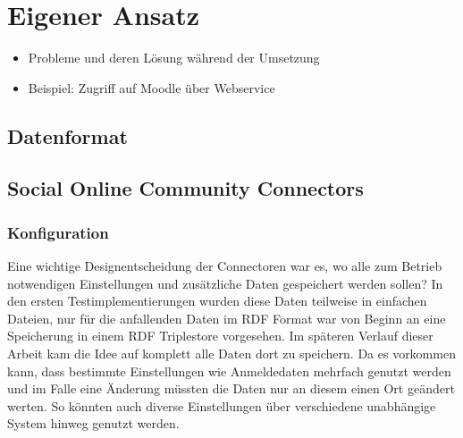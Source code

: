 
\chapter{Eigener Ansatz} %
\label{cha:eigener_ansatz}


\begin{itemize}
    \item Probleme und deren Lösung während der Umsetzung
    \item Beispiel: Zugriff auf Moodle über Webservice
\end{itemize}

\section{Datenformat} %
\label{sec:datenformat}


\section{Social Online Community Connectors} %
\label{sec:social_online_community_connectors}

\subsection{Konfiguration} %
\label{sub:konfiguration}

Eine wichtige Designentscheidung der Connectoren war es, wo alle zum Betrieb notwendigen Einstellungen und zusätzliche Daten gespeichert werden sollen? In den ersten Testimplementierungen wurden diese Daten teilweise in einfachen Dateien, nur für die anfallenden Daten im RDF Format war von Beginn an eine Speicherung in einem RDF Triplestore vorgesehen. Im späteren Verlauf dieser Arbeit kam die Idee auf komplett alle Daten dort zu speichern. Da es vorkommen kann, dass bestimmte Einstellungen wie Anmeldedaten mehrfach genutzt werden und im Falle eine Änderung müssten die Daten nur an diesem einen Ort geändert werten. So könnten auch diverse Einstellungen über verschiedene unabhängige System hinweg genutzt werden. 

\medskip


